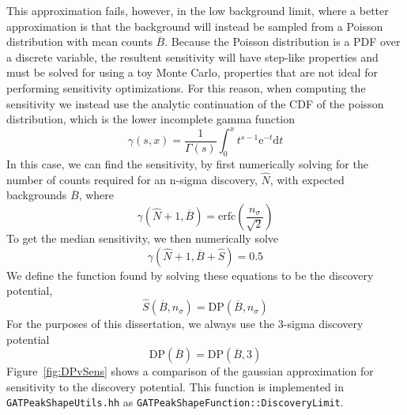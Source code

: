 \documentclass[/main.tex]{subfiles}
\begin{document}
This approximation fails, however, in the low background limit, where a better approximation is that the background will instead be sampled from a Poisson distribution with mean counts $\overline{B}$.
Because the Poisson distribution is a PDF over a discrete variable, the resultent sensitivity will have step-like properties and must be solved for using a toy Monte Carlo, properties that are not ideal for performing sensitivity optimizations.
For this reason, when computing the sensitivity we instead use the analytic continuation of the CDF of the poisson distribution, which is the lower incomplete gamma function
\begin{equation}
  \gamma(s, x)=\frac{1}{\Gamma(s)}\int_0^x t^{s-1} \mathrm{e}^{-t} \mathrm{d}t
\end{equation}
In this case, we can find the sensitivity, by first numerically solving for the number of counts required for an n-sigma discovery, $\hat{N}$, with expected backgrounds $\overline{B}$, where
\begin{equation}
  \gamma(\hat{N}+1, \overline{B}) = \mathrm{erfc}(\frac{n_\sigma}{\sqrt{2}})
\end{equation}
To get the median sensitivity, we then numerically solve
\begin{equation}
  \gamma(\hat{N}+1, \overline{B} + \hat{S}) = 0.5
\end{equation}
We define the function found by solving these equations to be the discovery potential\cite{2013CUORE},
\begin{equation}
  \hat{S}(\overline{B}, n_\sigma) = \mathrm{DP}(\overline{B}, n_\sigma)
\end{equation}
For the purposes of this dissertation, we always use the 3-sigma discovery potential
\begin{equation}
  \mathrm{DP}(\overline{B}) = \mathrm{DP}(\overline{B}, 3)
\end{equation}
Figure~\ref{fig:DPvSens} shows a comparison of the gaussian approximation for sensitivity to the discovery potential.
This function is implemented in \texttt{GATPeakShapeUtils.hh} as \linebreak\texttt{GATPeakShapeFunction::DiscoveryLimit}.
\end{document}
